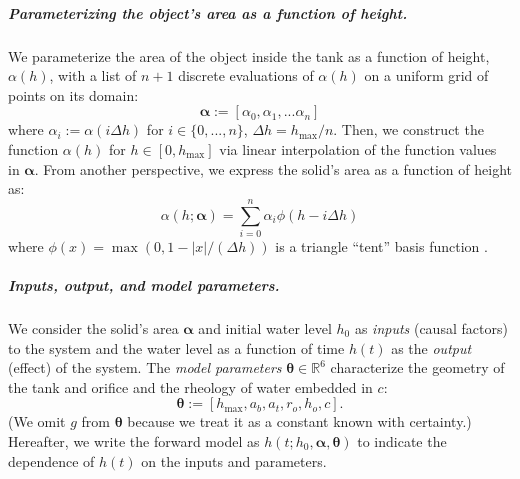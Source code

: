 \documentclass[openacc]{rsproca_new}%
\newcommand\themodel {$h(t; h_0, \boldsymbol \alpha, \boldsymbol\theta)$\xspace}
\begin{document}
\vspace{-\baselineskip}
\subparagraph{Parameterizing the object's area as a function of height.}
We parameterize the area of the object inside the tank as a function of height, $\alpha(h)$, with a list of $n+1$ discrete evaluations of $\alpha(h)$ on a uniform grid of points on its domain:
\begin{equation}
	\boldsymbol \alpha := [\alpha_0, \alpha_1, ... \alpha_n] \label{eq:alpha}
\end{equation}
where $\alpha_i :=\alpha(i \Delta h)$ for $i \in \{0, ..., n\}$, $\Delta h = h_{\text{max}}/n$. Then, we construct the function $\alpha(h)$ for $h\in [0, h_{\text{max}}]$ via linear interpolation of the function values in $\boldsymbol \alpha$. 
From another perspective, we express the solid's area as a function of height as:
\begin{equation}
	\alpha(h; \boldsymbol \alpha) = \sum_{i=0}^n \alpha_i \phi(h-i \Delta h) \label{eq:alpha_basis}
\end{equation} where $\phi(x)= \max(0, 1-\lvert x \rvert / (\Delta h)) $ is a triangle ``tent'' basis function \cite{hat_functions}.

\vspace{-\baselineskip}
\subparagraph{Inputs, output, and model parameters.} 
We
consider the solid's area $\boldsymbol \alpha$ and initial water level $h_0$ as \emph{inputs} (causal factors) to the system and the water level as a function of time $h(t)$ as the \emph{output} (effect) of the system.
The \emph{model parameters} $\boldsymbol \theta \in \mathbb{R}^6$ characterize the geometry of the tank and orifice and the rheology of water embedded in $c$:
\begin{equation}
	\boldsymbol \theta := [h_{\text{max}}, a_b, a_t, r_o, h_o, c]. \label{eq:theta}
\end{equation}
(We omit $g$ from $\boldsymbol \theta$ because we treat it as a constant known with certainty.)
Hereafter, we write the forward model as \themodel to indicate the dependence of $h(t)$ on the inputs and parameters.
\end{document}
